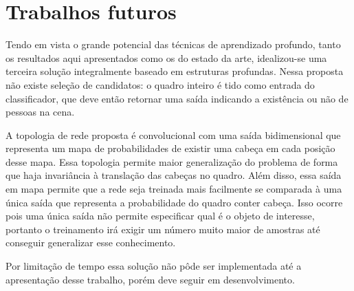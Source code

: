 \section*{Trabalhos futuros}

Tendo em vista o grande potencial das técnicas de aprendizado profundo, tanto os resultados aqui apresentados como os do estado da arte, idealizou-se uma terceira solução integralmente baseado em estruturas profundas. Nessa proposta não existe seleção de candidatos: o quadro inteiro é tido como entrada do classificador, que deve então retornar uma saída indicando a existência ou não de pessoas na cena.

A topologia de rede proposta é convolucional com uma saída bidimensional que representa um mapa de probabilidades de existir uma cabeça em cada posição desse mapa. Essa topologia permite maior generalização do problema de forma que haja invariância à translação das cabeças no quadro. Além disso, essa saída em mapa permite que a rede seja treinada mais facilmente se comparada à uma única saída que representa a probabilidade do quadro conter cabeça. Isso ocorre pois uma única saída não permite especificar qual é o objeto de interesse, portanto o treinamento irá exigir um número muito maior de amostras até conseguir generalizar esse conhecimento.

Por limitação de tempo essa solução não pôde ser implementada até a apresentação desse trabalho, porém deve seguir em desenvolvimento.
